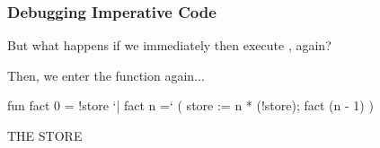 \documentclass[aspectratio=169, handout]{beamer}
\begin{document}
\begin{frame}[fragile]
  \frametitle{Debugging Imperative Code}

  \begin{minipage}[t][0.6in][t]{\textwidth}
    But what happens if we immediately then execute , again?

    \vspace{\fill}

    Then, we enter the function again...
  \end{minipage}

  \vspace{10pt}

  \begin{center}
    \begin{minipage}[t][1.7in][t]{0.6\textwidth}
      \vspace{\fill}
      \begin{codeblock}
        fun fact 0 = !store
          `| fact n =`
              ( store := n * (!store);
                fact (n - 1)
              )
      \end{codeblock}
      \vspace{\fill}
    \end{minipage}
    \hfill\vline\hfill
    \begin{minipage}[t][1.7in][t]{0.3\textwidth}
      \centering
      {\hspace{-20pt}\color{gray} \large THE STORE}

      \vspace{\fill}
      \vspace{\fill}
    \end{minipage}
  \end{center}
\end{frame}
\end{document}

